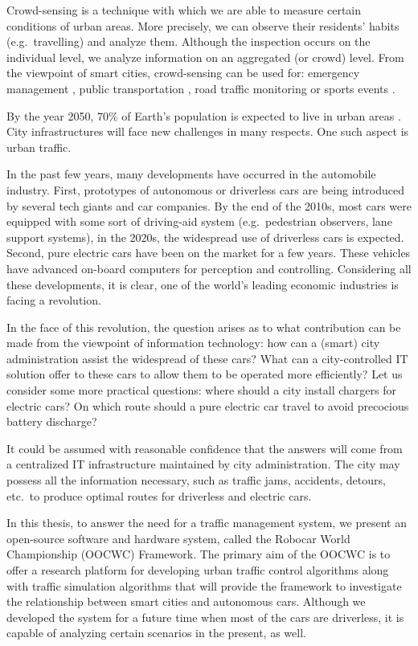 \documentclass[b5paper,12pt]{report}
\theoremstyle{definition}
\begin{document}
Crowd-sensing is a technique with which we are able to measure certain conditions of urban areas. More precisely, we can observe their residents' habits (e.g.\ travelling) and analyze them. Although the inspection occurs on the individual level, we analyze information on an aggregated (or crowd) level. From the viewpoint of smart cities, crowd-sensing can be used for: emergency management \cite{du2012research}, public transportation \cite{szabo2013framework}, road traffic monitoring \cite{mohan2008nericell} or sports events \cite{besenczi2013kozossegi}.

By the year 2050, 70\% of Earth's population is expected to live in urban areas \cite{bocquier2005world}. City infrastructures will face new challenges in many respects. One such aspect is urban traffic.

In the past few years, many developments have occurred in the automobile industry. First, prototypes of autonomous or driverless cars are being introduced by several tech giants and car companies. By the end of the 2010s, most cars were equipped with some sort of driving-aid system (e.g.\ pedestrian observers, lane support systems), in the 2020s, the widespread use of driverless cars is expected. Second, pure electric cars have been on the market for a few years. These vehicles have advanced on-board computers for perception and controlling. Considering all these developments, it is clear, one of the world's leading economic industries is facing a revolution.

In the face of this revolution, the question arises as to what contribution can be made from the viewpoint of information technology: how can a (smart) city administration assist the widespread of these cars? What can a city-controlled IT solution offer to these cars to allow them to be operated more efficiently? Let us consider some more practical questions: where should a city install chargers for electric cars? On which route should a pure electric car travel to avoid precocious battery discharge?

It could be assumed with reasonable confidence that the answers will come from a centralized IT infrastructure maintained by city administration. The city may possess all the information necessary, such as traffic jams, accidents, detours, etc.~to produce optimal routes for driverless and electric cars.

In this thesis, to answer the need for a traffic management system, we present an open-source software and hardware system, called the Robocar World Championship (OOCWC) Framework. The primary aim of the OOCWC is to offer a research platform for developing urban traffic control algorithms along with traffic simulation algorithms that will provide the framework to investigate the relationship between smart cities and autonomous cars. Although we developed the system for a future time when most of the cars are driverless, it is capable of analyzing certain scenarios in the present, as well.
\end{document}
